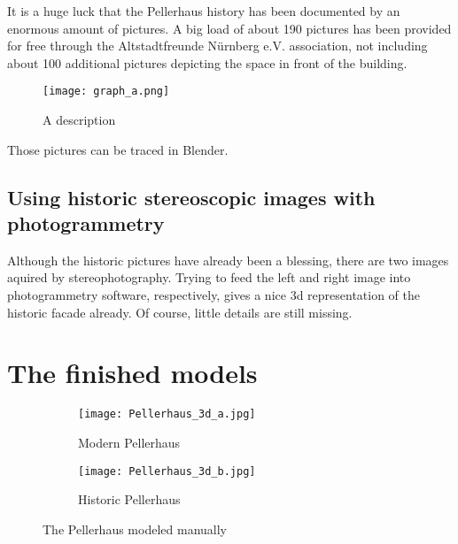 It is a huge luck that the Pellerhaus history has been documented by an enormous amount of pictures. A big load of about 190 pictures has been provided for free through the Altstadtfreunde Nürnberg e.V. association, not including about 100 additional pictures depicting the space in front of the building.


\begin{figure}[h]
	\centering
	\texttt{[image: graph\_a.png]}
	\caption{A description}
	\label{fig:something}
\end{figure}

Those pictures can be traced in Blender.

\subsection{Using historic stereoscopic images with photogrammetry}

Although the historic pictures have already been a blessing, there are two images aquired by stereophotography. Trying to feed the left and right image into photogrammetry software, respectively, gives a nice 3d representation of the historic facade already. Of course, little details are still missing.






\section{The finished models}



\begin{figure}[h]
	\centering
	\begin{subfigure}[b]{0.45\textwidth}
		\centering
		\texttt{[image: Pellerhaus\_3d\_a.jpg]}
		\caption{Modern Pellerhaus}
		\label{fig:pellerhaus_3d_modern}
	\end{subfigure}
	\hfill
	\begin{subfigure}[b]{0.45\textwidth}
		\centering
		\texttt{[image: Pellerhaus\_3d\_b.jpg]}
		\caption{Historic Pellerhaus}
		\label{fig:pellerhaus_3d_historic}
	\end{subfigure}
	\caption{The Pellerhaus modeled manually}
	\label{fig:pellerhaus_3d_models}
\end{figure}







